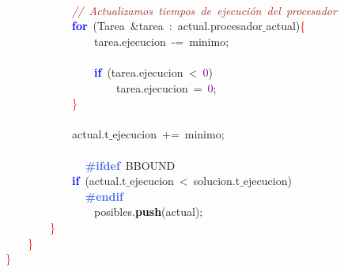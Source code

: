\mbox{} \\
\mbox{}\ \ \ \ \ \ \ \ \ \ \ \ \ \ \ \ \textit{\textcolor{Brown}{//\ Actualizamos\ tiempos\ de\ ejecución\ del\ procesador}} \\
\mbox{}\ \ \ \ \ \ \ \ \ \ \ \ \ \ \ \ \textbf{\textcolor{Blue}{for}}\ \textcolor{BrickRed}{(}\textcolor{TealBlue}{Tarea}\ \textcolor{BrickRed}{\&}tarea\ \textcolor{BrickRed}{:}\ actual\textcolor{BrickRed}{.}procesador$\_$actual\textcolor{BrickRed}{)}\textcolor{Red}{\{} \\
\mbox{}\ \ \ \ \ \ \ \ \ \ \ \ \ \ \ \ \ \ \ \ tarea\textcolor{BrickRed}{.}ejecucion\ \textcolor{BrickRed}{-=}\ minimo\textcolor{BrickRed}{;} \\
\mbox{} \\
\mbox{}\ \ \ \ \ \ \ \ \ \ \ \ \ \ \ \ \ \ \ \ \textbf{\textcolor{Blue}{if}}\ \textcolor{BrickRed}{(}tarea\textcolor{BrickRed}{.}ejecucion\ \textcolor{BrickRed}{\textless{}}\ \textcolor{Purple}{0}\textcolor{BrickRed}{)} \\
\mbox{}\ \ \ \ \ \ \ \ \ \ \ \ \ \ \ \ \ \ \ \ \ \ \ \ tarea\textcolor{BrickRed}{.}ejecucion\ \textcolor{BrickRed}{=}\ \textcolor{Purple}{0}\textcolor{BrickRed}{;} \\
\mbox{}\ \ \ \ \ \ \ \ \ \ \ \ \ \ \ \ \textcolor{Red}{\}} \\
\mbox{} \\
\mbox{}\ \ \ \ \ \ \ \ \ \ \ \ \ \ \ \ actual\textcolor{BrickRed}{.}t$\_$ejecucion\ \textcolor{BrickRed}{+=}\ minimo\textcolor{BrickRed}{;} \\
\mbox{}\ \ \ \ \ \ \ \ \ \ \ \ \ \ \ \  \\
\mbox{}\textbf{\textcolor{RoyalBlue}{\ \ \ \ \ \ \ \ \ \ \ \ \ \ \ \ \#ifdef}}\ BBOUND \\
\mbox{}\ \ \ \ \ \ \ \ \ \ \ \ \ \ \ \ \textbf{\textcolor{Blue}{if}}\ \textcolor{BrickRed}{(}actual\textcolor{BrickRed}{.}t$\_$ejecucion\ \textcolor{BrickRed}{\textless{}}\ solucion\textcolor{BrickRed}{.}t$\_$ejecucion\textcolor{BrickRed}{)} \\
\mbox{}\textbf{\textcolor{RoyalBlue}{\ \ \ \ \ \ \ \ \ \ \ \ \ \ \ \ \#endif}} \\
\mbox{}\ \ \ \ \ \ \ \ \ \ \ \ \ \ \ \ \ \ \ \ posibles\textcolor{BrickRed}{.}\textbf{\textcolor{Black}{push}}\textcolor{BrickRed}{(}actual\textcolor{BrickRed}{);} \\
\mbox{}\ \ \ \ \ \ \ \ \ \ \ \ \textcolor{Red}{\}} \\
\mbox{}\ \ \ \ \ \ \ \ \textcolor{Red}{\}} \\
\mbox{}\ \ \ \ \textcolor{Red}{\}} \\

